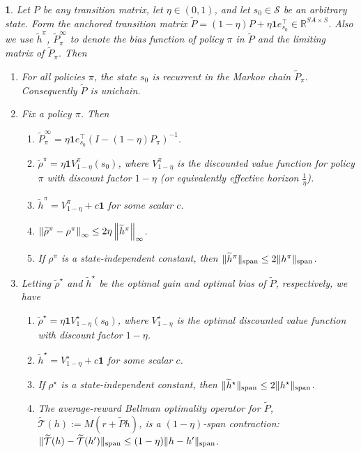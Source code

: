 \documentclass{article}
\theoremstyle{plain}
\theoremstyle{plain}
\newtheorem{lem}[thm]{\protect\lemmaname}
\theoremstyle{remark}
\theoremstyle{plain}
\theoremstyle{plain}
\providecommand{\lemmaname}{Lemma}
\newcommand{\R}{\mathbb{R}}
\newcommand{\one}{\mathbf{1}}
\renewcommand{\S}{\mathcal{S}}
\newcommand{\htilde}{\widetilde{h}}
\newcommand{\rhot}{\widetilde{\rho}}
\newcommand{\Topt}{\widetilde{\mathcal{T}}}
\begin{document}
\begin{lem}
\label{lem:anchoring_optimality_properties}
    Let $P$ be any transition matrix, let $\eta \in (0,1)$, and let $s_0 \in \S$ be an arbitrary state. Form the anchored transition matrix $\widetilde{P} = (1-\eta) P + \eta \one e_{s_0}^\top \in \R^{SA \times S}$. Also we use $\widetilde{h}^\pi$, $\widetilde{P}_\pi^\infty$ to denote the bias function of policy $\pi$ in $\widetilde{P}$ and the limiting matrix of $\widetilde{P}_\pi$.
    Then
    \begin{enumerate}
        \item For all policies $\pi$, the state $s_0$ is recurrent in the Markov chain $\widetilde{P}_\pi$. Consequently $\widetilde{P}$ is unichain.

        \item Fix a policy $\pi$. Then
        \begin{enumerate}
            \item $\widetilde{P}_\pi^\infty  = \eta \one e_{s_0}^\top (I - (1-\eta)P_\pi)^{-1}$.
            \item $\widetilde{\rho}^\pi = \eta \one V_{1-\eta}^\pi(s_0)$, where $V_{1-\eta}^\pi$ is the discounted value function for policy $\pi$ with discount factor $1-\eta$ (or equivalently effective horizon $\frac{1}{\eta}$).
            \item $\widetilde{h}^\pi = V_{1-\eta}^\pi + c \one$ for some scalar $c$.
            \item $\infnorm{\rhot^\pi - \rho^\pi} \leq 2\eta \infnorm{\htilde^{\pi}}$. %
            \item If $\rho^\pi$ is a state-independent constant, then $\spannorm{\htilde^\pi} \leq 2\spannorm{h^\pi}$.
        \end{enumerate}

        \item Letting $\rhot^\star$ and $\htilde^\star$ be the optimal gain and optimal bias of $\widetilde{P}$, respectively, we have
        \begin{enumerate}
            \item $\widetilde{\rho}^\star = \eta \one V_{1-\eta}^\star(s_0)$, where $V_{1-\eta}^\star$ is the optimal discounted value function with discount factor $1-\eta$.
            \item $\widetilde{h}^\star = V_{1-\eta}^\star + c \one$ for some scalar $c$.
            \item If $\rho^\star$ is a state-independent constant, then $\spannorm{\htilde^\star} \leq 2 \spannorm{h^\star}$.
            \item The average-reward Bellman optimality operator for $\widetilde{P}$, $\Topt(h) := M(r + \widetilde{P} h)$, is a $(1-\eta)$-span contraction:
            $\spannorm{\Topt(h) - \Topt(h')} \leq (1-\eta) \spannorm{h - h'}$.
        \end{enumerate}
    \end{enumerate}
\end{lem}
\end{document}
